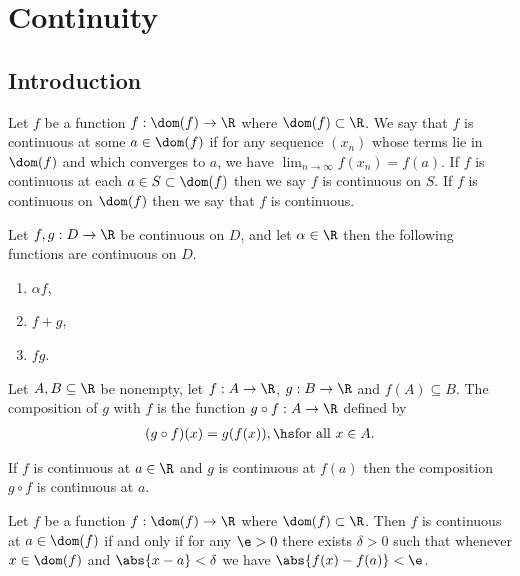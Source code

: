 \documentclass{article}
\begin{document}
\section{Continuity}


\subsection{Introduction}

\begin{definition}
    Let $f$ be a function $f:\dom(f)\to\R$ where $\dom(f)\subset\R$.
    We say that $f$ is continuous at some $a\in\dom(f)$ if for any
    sequence $(x_n)$ whose terms lie in $\dom(f)$ and which converges
    to $a$, we have $\lim_{n\to\infty}f(x_n)=f(a)$. If $f$ is continuous
    at each $a\in S\subset\dom(f)$ then we say $f$ is continuous on $S$.
    If $f$ is continuous on $\dom(f)$ then we say that $f$ is continuous.
\end{definition}

\setcounter{theorem}{2}
\begin{theorem}
    Let $f,g:D\to\R$ be continuous on $D$, and let $\alpha\in\R$ then the
    following functions are continuous on $D$.
    \begin{enumerate}
        \item $\alpha f$,
        \item $f+g$,
        \item $fg$.
    \end{enumerate}
\end{theorem}

\begin{definition}
    Let $A,B\subseteq \R$ be nonempty, let $f:A\to\R$, $g:B\to\R$ and
    $f(A)\subseteq B$. The composition of $g$ with $f$ is the function
    $g\circ f:A\to\R$ defined by
    \begin{align*}
        (g\circ f)(x) = g(f(x)),\hs\text{for all }x\in A.
    \end{align*}
\end{definition}

\begin{theorem}
    If $f$ is continuous at $a\in\R$ and $g$ is continuous at $f(a)$ then
    the composition $g\circ f$ is continuous at $a$.
\end{theorem}

\begin{theorem}
    Let $f$ be a function $f:\dom(f)\to\R$ where $\dom(f) \subset\R$.
    Then $f$ is continuous at $a\in\dom(f)$ if and only if for any
    $\e>0$ there exists $\delta>0$ such that whenever $x\in\dom(f)$
    and $\abs{x-a}<\delta$ we have $\abs{f(x)-f(a)}<\e$.
\end{theorem}
\end{document}

